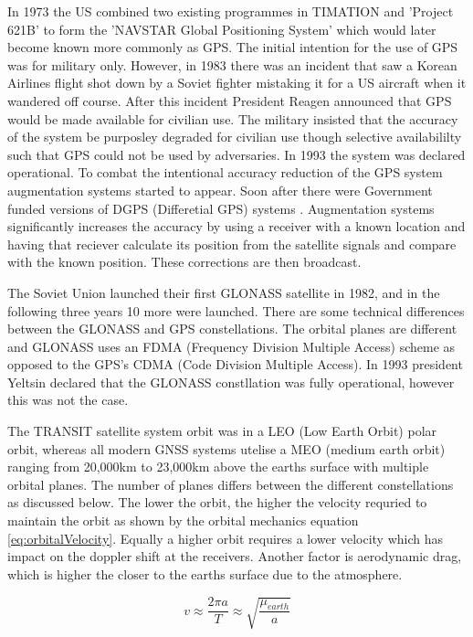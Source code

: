 In 1973 the US combined two existing programmes in TIMATION and 'Project 621B' to form the 'NAVSTAR Global Positioning System' which would later become known more
commonly as GPS. The initial intention for the use of GPS was for military only. However, in 1983 there was an incident that saw a Korean Airlines flight shot down by a
Soviet fighter mistaking it for a US aircraft when it wandered off course. After this incident President Reagen announced that GPS would be made available for civilian
use. The military insisted that the accuracy of the system be purposley degraded for civilian use though selective availabililty such that GPS could not be used by
adversaries. In 1993 the system was declared operational. To combat the intentional accuracy reduction of the GPS system augmentation systems started to appear. Soon
after there were Government funded versions of DGPS (Differetial GPS) systems \cite{RN43}. Augmentation systems significantly increases the accuracy by using a receiver with a known
location and having that reciever calculate its position from the satellite signals and compare with the known position. These corrections are then broadcast. 

The Soviet Union launched their first GLONASS satellite in 1982, and in the following three years 10 more were launched. There are some technical differences between the
GLONASS and GPS constellations. The orbital planes are different and GLONASS uses an FDMA (Frequency Division Multiple Access) scheme as opposed to the GPS's CDMA (Code
Division Multiple Access). In 1993 president Yeltsin declared that the GLONASS constllation was fully operational, however this was not the case. 

The TRANSIT satellite system orbit was in a LEO (Low Earth Orbit) polar orbit, whereas all modern GNSS systems utelise a MEO (medium earth orbit) ranging from 20,000km to
23,000km above the earths surface with multiple orbital planes. The number of planes differs between the different constellations as discussed below.
The lower the orbit, the higher the velocity requried to maintain the orbit as shown by the orbital mechanics equation \ref{eq:orbitalVelocity}. Equally a higher orbit requires a lower velocity which
has impact on the doppler shift at the receivers. Another factor is aerodynamic drag, which is higher the closer to the earths surface due to the atmosphere.

\begin{equation} \label{eq:orbitalVelocity}
    v \approx \frac{2\pi a}{T} \approx \sqrt{\frac{\mu_{earth}}{a}}
\end{equation} 

